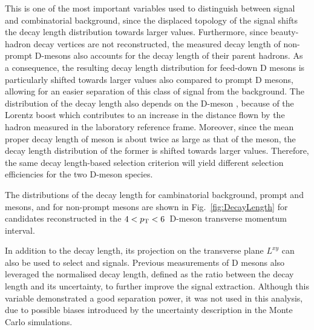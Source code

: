 This is one of the most important variables used to distinguish between signal and combinatorial background, since the displaced topology of the signal shifts the decay length distribution towards larger values. Furthermore, since beauty-hadron decay vertices are not reconstructed, the measured decay length of non-prompt D-mesons also accounts for the decay length of their parent hadrons. As a consequence, the resulting decay length distribution for feed-down D mesons is particularly shifted towards larger values also compared to prompt D mesons, allowing for an easier separation of this class of signal from the background. The distribution of the decay length also depends on the D-meson \pt, because of the Lorentz boost which contributes to an increase in the distance flown by the hadron measured in the laboratory reference frame. Moreover, since the mean proper decay length of \dpl meson is about twice as large as that of the \ds meson, the decay length distribution of the former is shifted towards larger values. Therefore, the same decay length-based selection criterion will yield different selection efficiencies for the two D-meson species.

The distributions of the decay length for cambinatorial background, prompt \ds and \dpl mesons, and for non-prompt \ds mesons are shown in Fig.~\ref{fig:DecayLength} for candidates reconstructed in the $4 < p_\mathrm{T} < 6$~\gevc D-meson transverse momentum interval. 

In addition to the decay length, its projection on the transverse plane $L^{xy}$ can also be used to select \ds and \dpl signals. %
Previous measurements of D mesons also leveraged the normalised decay length, defined as the ratio between the decay length and its uncertainty, to further improve the signal extraction. Although this variable demonstrated a good separation power, it was not used in this analysis, due to possible biases introduced by the uncertainty description in the Monte Carlo simulations.

